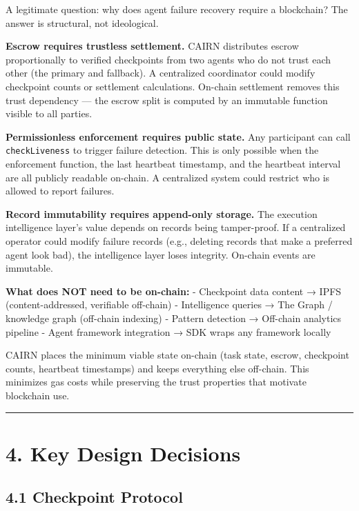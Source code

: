 \documentclass[
  10pt,
]{article}
\begin{document}
A legitimate question: why does agent failure recovery require a
blockchain? The answer is structural, not ideological.

\textbf{Escrow requires trustless settlement.} CAIRN distributes escrow
proportionally to verified checkpoints from two agents who do not trust
each other (the primary and fallback). A centralized coordinator could
modify checkpoint counts or settlement calculations. On-chain settlement
removes this trust dependency --- the escrow split is computed by an
immutable function visible to all parties.

\textbf{Permissionless enforcement requires public state.} Any
participant can call \texttt{checkLiveness} to trigger failure
detection. This is only possible when the enforcement function, the last
heartbeat timestamp, and the heartbeat interval are all publicly
readable on-chain. A centralized system could restrict who is allowed to
report failures.

\textbf{Record immutability requires append-only storage.} The execution
intelligence layer's value depends on records being tamper-proof. If a
centralized operator could modify failure records (e.g., deleting
records that make a preferred agent look bad), the intelligence layer
loses integrity. On-chain events are immutable.

\textbf{What does NOT need to be on-chain:} - Checkpoint data content →
IPFS (content-addressed, verifiable off-chain) - Intelligence queries →
The Graph / knowledge graph (off-chain indexing) - Pattern detection →
Off-chain analytics pipeline - Agent framework integration → SDK wraps
any framework locally

CAIRN places the minimum viable state on-chain (task state, escrow,
checkpoint counts, heartbeat timestamps) and keeps everything else
off-chain. This minimizes gas costs while preserving the trust
properties that motivate blockchain use.

\begin{center}\rule{0.5\linewidth}{0.5pt}\end{center}

\hypertarget{key-design-decisions}{%
\section{4. Key Design Decisions}\label{key-design-decisions}}

\hypertarget{checkpoint-protocol}{%
\subsection{4.1 Checkpoint Protocol}\label{checkpoint-protocol}}
\end{document}
